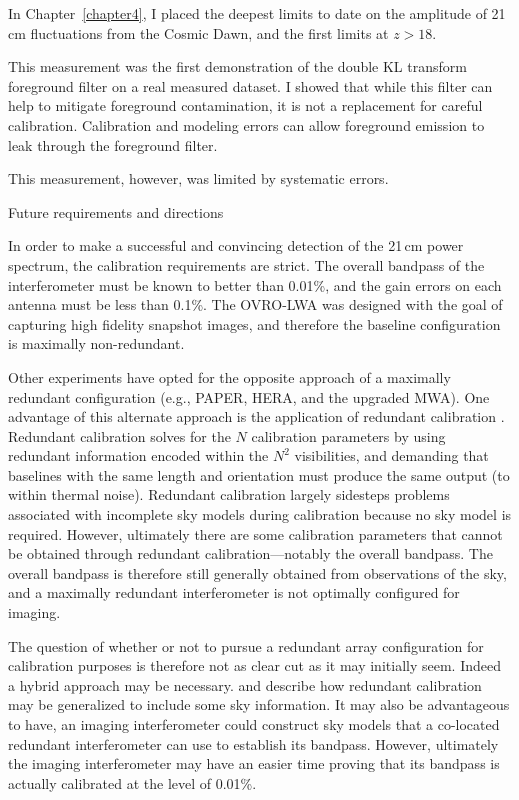 \begin{bibunit}
In Chapter~\ref{chapter4}, I placed the deepest limits to date on the amplitude of 21\,cm
fluctuations from the Cosmic Dawn, and the first limits at $z > 18$.

This measurement was the first demonstration of the double KL transform foreground filter on a real
measured dataset. I showed that while this filter can help to mitigate foreground contamination, it
is not a replacement for careful calibration. Calibration and modeling errors can allow foreground
emission to leak through the foreground filter.

This measurement, however, was limited by systematic errors.

Future requirements and directions

In order to make a successful and convincing detection of the 21\,cm power spectrum, the calibration
requirements are strict. The overall bandpass of the interferometer must be known to better than
0.01\%, and the gain errors on each antenna must be less than 0.1\%. The OVRO-LWA was designed with
the goal of capturing high fidelity snapshot images, and therefore the baseline configuration is
maximally non-redundant.

Other experiments have opted for the opposite approach of a maximally redundant configuration (e.g.,
PAPER, HERA, and the upgraded MWA). One advantage of this alternate approach is the application of
redundant calibration \citep{2010MNRAS.408.1029L}. Redundant calibration solves for the $N$
calibration parameters by using redundant information encoded within the $N^2$ visibilities, and
demanding that baselines with the same length and orientation must produce the same output (to
within thermal noise). Redundant calibration largely sidesteps problems associated with incomplete
sky models during calibration because no sky model is required. However, ultimately there are some
calibration parameters that cannot be obtained through redundant calibration---notably the overall
bandpass. The overall bandpass is therefore still generally obtained from observations of the sky,
and a maximally redundant interferometer is not optimally configured for imaging.

The question of whether or not to pursue a redundant array configuration for calibration purposes is
therefore not as clear cut as it may initially seem.  Indeed a hybrid approach may be necessary.
\citet{2010MNRAS.408.1029L} and \citet{2017arXiv170101860S} describe how redundant calibration may
be generalized to include some sky information.  It may also be advantageous to have, an imaging
interferometer could construct sky models that a co-located redundant interferometer can use to
establish its bandpass. However, ultimately the imaging interferometer may have an easier time
proving that its bandpass is actually calibrated at the level of 0.01\%.


\end{bibunit}
